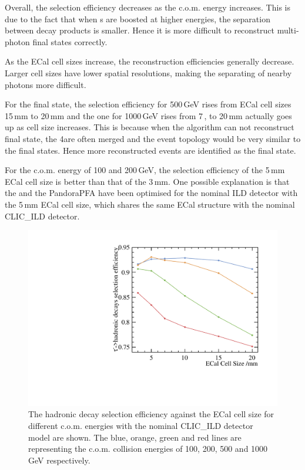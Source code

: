 \documentclass[a4paper,11pt]{article}
\begin{document}
Overall, the selection efficiency decreases as the c.o.m. energy increases. This is due to the fact that when {\Ptau}s are boosted at higher energies, the separation between decay products is smaller. Hence it is more difficult to reconstruct multi-photon final states correctly.

As the ECal cell sizes increase, the reconstruction efficiencies generally decrease. Larger cell sizes have lower spatial resolutions, making the separating of nearby photons more difficult.

For the \Pphoton\Pnut final state, the selection efficiency for 500\,GeV rises from ECal cell sizes 15\,mm to 20\,mm and the one for 1000\,GeV rises from 7\,, to 20\,mm actually goes up as cell size increases. This is because when the algorithm can not reconstruct \Pphoton\Pnut final state, the 4\Pphoton are often merged and the event topology would be very similar to the \Pphoton\Pnut final states. Hence more reconstructed events are identified as the \Pphoton\Pnut final state.

For the c.o.m. energy of 100 and 200\,GeV, the selection efficiency of the 5\,mm ECal cell size is better than that of the 3\,mm. One possible explanation is that the  and the PandoraPFA have been optimised for the nominal ILD detector with the 5\,mm ECal cell size, which shares the same ECal structure with the nominal CLIC\_ILD detector.

\begin{figure}[htbp]
\centering %
\includegraphics[width=.4\textwidth]{plots/hadEff}
\caption{\label{fig:hadronic_efficiency} The \Ptau hadronic decay selection efficiency against the ECal cell size for different c.o.m. energies with the nominal CLIC\_ILD detector model are shown. The blue, orange, green and red lines are representing the c.o.m. \Pelectron\APelectron collision energies of 100, 200, 500 and 1000\,GeV respectively.}
\end{figure}
\end{document}
